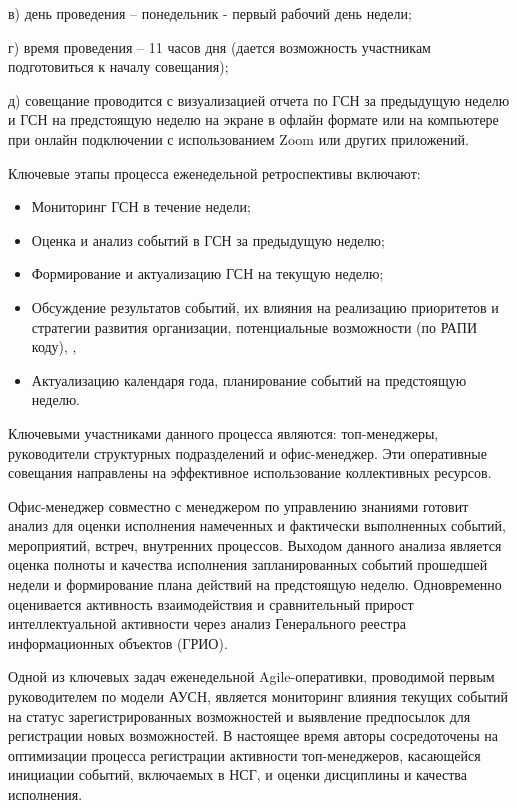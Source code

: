 \begin{multicols}{2}
в) день проведения -- понедельник - первый рабочий день недели;

г) время проведения -- 11 часов дня (дается возможность участникам
подготовиться к началу совещания);

д) совещание проводится с визуализацией отчета по ГСН за предыдущую
неделю и ГСН на предстоящую неделю на экране в офлайн формате или на
компьютере при онлайн подключении с использованием Zoom или других
приложений.

Ключевые этапы процесса еженедельной ретроспективы включают:

\begin{itemize}
\item
  Мониторинг ГСН в течение недели;
\item
  Оценка и анализ событий в ГСН за предыдущую неделю;
\item
  Формирование и актуализацию ГСН на текущую неделю;
\item
  Обсуждение результатов событий, их влияния на реализацию приоритетов и
  стратегии развития организации, потенциальные возможности (по РАПИ
  коду), ,
\item
  Актуализацию календаря года, планирование событий на предстоящую
  неделю.
\end{itemize}

Ключевыми участниками данного процесса являются: топ-менеджеры,
руководители структурных подразделений и офис-менеджер. Эти оперативные
совещания направлены на эффективное использование коллективных ресурсов.

Офис-менеджер совместно с менеджером по управлению знаниями готовит
анализ для оценки исполнения намеченных и фактически выполненных
событий, мероприятий, встреч, внутренних процессов. Выходом данного
анализа является оценка полноты и качества исполнения запланированных
событий прошедшей недели и формирование плана действий на предстоящую
неделю. Одновременно оценивается активность взаимодействия и
сравнительный прирост интеллектуальной активности через анализ
Генерального реестра информационных объектов (ГРИО).

Одной из ключевых задач еженедельной Agile-оперативки, проводимой первым
руководителем по модели АУСН, является мониторинг влияния текущих
событий на статус зарегистрированных возможностей и выявление
предпосылок для регистрации новых возможностей. В настоящее время авторы
сосредоточены на оптимизации процесса регистрации активности
топ-менеджеров, касающейся инициации событий, включаемых в НСГ, и оценки
дисциплины и качества исполнения.


\end{multicols}
